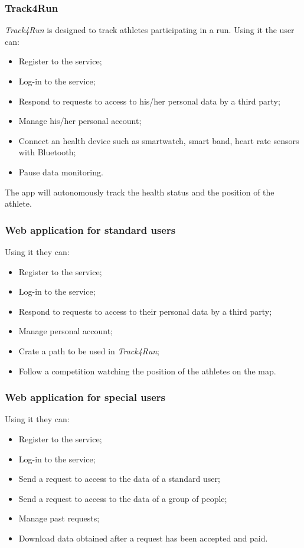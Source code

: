 \subsubsection{Track4Run}
\textit{Track4Run} is designed to track athletes participating in a run.
Using it the user can:
\begin{itemize}
\item Register to the service;
\item Log-in to the service;
\item Respond to requests to access to his/her personal data by a third party;
\item Manage his/her personal account;
\item Connect an health device such as smartwatch, smart band, heart rate sensors with Bluetooth;
\item Pause data monitoring.
\end{itemize}
The app will autonomously track the health status and the position of the athlete.

\subsubsection{Web application for standard users}
Using it they can:
\begin{itemize}
\item Register to the service;
\item Log-in to the service;
\item Respond to requests to access to their personal data by a third party;
\item Manage personal account;
\item Crate a path to be used in \textit{Track4Run};
\item Follow a competition watching the position of the athletes on the map.
\end{itemize}

\subsubsection{Web application for special users}
Using it they can:
\begin{itemize}
\item Register to the service;
\item Log-in to the service;
\item Send a request to access to the data of a standard user;
\item Send a request to access to the data of a group of people;
\item Manage past requests;
\item Download data obtained after a request has been accepted and paid.
\end{itemize}


